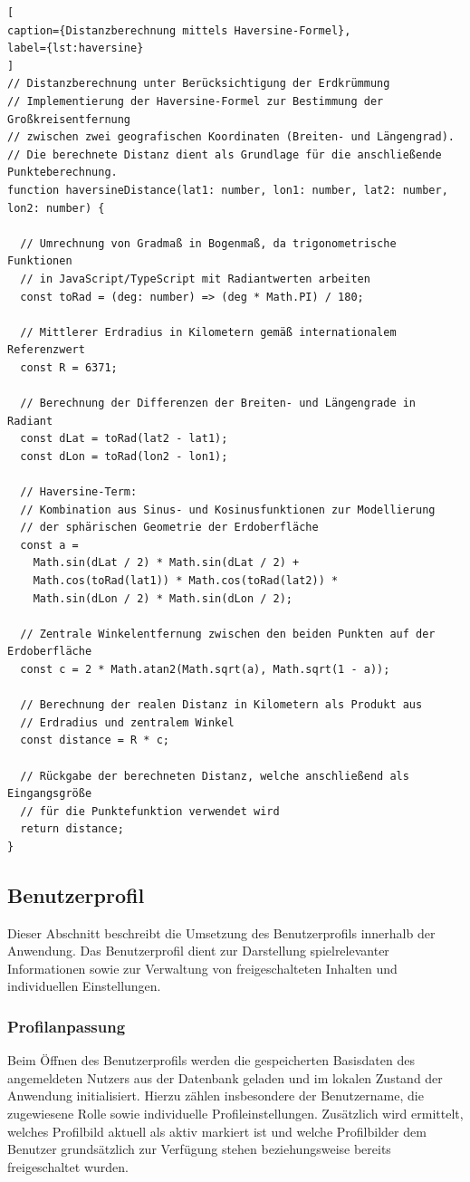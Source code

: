 \begin{lstlisting}[
caption={Distanzberechnung mittels Haversine-Formel},
label={lst:haversine}
]
// Distanzberechnung unter Berücksichtigung der Erdkrümmung
// Implementierung der Haversine-Formel zur Bestimmung der Großkreisentfernung
// zwischen zwei geografischen Koordinaten (Breiten- und Längengrad).
// Die berechnete Distanz dient als Grundlage für die anschließende Punkteberechnung.
function haversineDistance(lat1: number, lon1: number, lat2: number, lon2: number) {

  // Umrechnung von Gradmaß in Bogenmaß, da trigonometrische Funktionen
  // in JavaScript/TypeScript mit Radiantwerten arbeiten
  const toRad = (deg: number) => (deg * Math.PI) / 180;

  // Mittlerer Erdradius in Kilometern gemäß internationalem Referenzwert
  const R = 6371;

  // Berechnung der Differenzen der Breiten- und Längengrade in Radiant
  const dLat = toRad(lat2 - lat1);
  const dLon = toRad(lon2 - lon1);

  // Haversine-Term:
  // Kombination aus Sinus- und Kosinusfunktionen zur Modellierung
  // der sphärischen Geometrie der Erdoberfläche
  const a =
    Math.sin(dLat / 2) * Math.sin(dLat / 2) +
    Math.cos(toRad(lat1)) * Math.cos(toRad(lat2)) *
    Math.sin(dLon / 2) * Math.sin(dLon / 2);

  // Zentrale Winkelentfernung zwischen den beiden Punkten auf der Erdoberfläche
  const c = 2 * Math.atan2(Math.sqrt(a), Math.sqrt(1 - a));

  // Berechnung der realen Distanz in Kilometern als Produkt aus
  // Erdradius und zentralem Winkel
  const distance = R * c;

  // Rückgabe der berechneten Distanz, welche anschließend als Eingangsgröße
  // für die Punktefunktion verwendet wird
  return distance;
}
\end{lstlisting}

\subsection{Benutzerprofil}
Dieser Abschnitt beschreibt die Umsetzung des Benutzerprofils innerhalb der Anwendung.
Das Benutzerprofil dient zur Darstellung spielrelevanter Informationen sowie zur Verwaltung
von freigeschalteten Inhalten und individuellen Einstellungen.

\subsubsection{Profilanpassung}
Beim Öffnen des Benutzerprofils werden die gespeicherten Basisdaten des angemeldeten Nutzers aus der Datenbank geladen und im lokalen Zustand der Anwendung initialisiert. 
Hierzu zählen insbesondere der Benutzername, die zugewiesene Rolle sowie individuelle Profileinstellungen. 
Zusätzlich wird ermittelt, welches Profilbild aktuell als aktiv markiert ist und welche Profilbilder dem Benutzer grundsätzlich zur Verfügung stehen beziehungsweise bereits freigeschaltet wurden.

